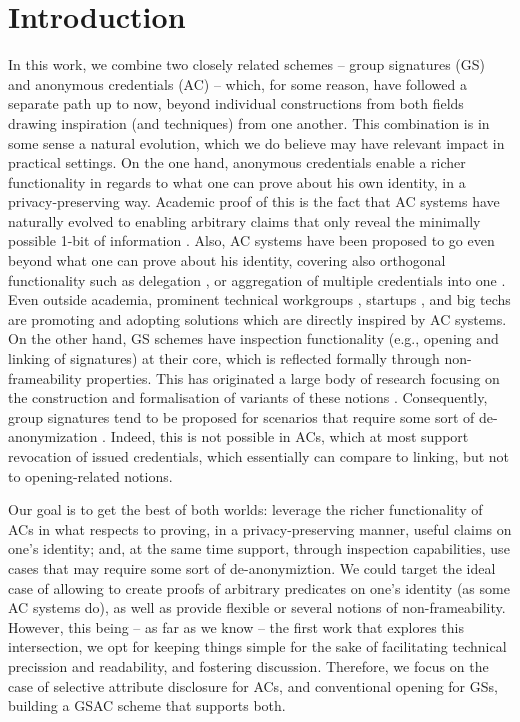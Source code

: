 \section{Introduction}
\label{sec:introduction}

In this work, we combine two closely related schemes -- group signatures (GS)
and anonymous credentials (AC) -- which, for some reason, have followed a
separate path up to now, beyond individual constructions from both fields
drawing inspiration (and techniques) from one another. This combination is in
some sense a natural evolution, which we do believe may have relevant impact in
practical settings. On the one hand, anonymous credentials enable a richer
functionality in regards to what one can prove about his own identity, in a
privacy-preserving way. Academic proof of this is the fact that AC systems have
naturally evolved to enabling arbitrary claims that only reveal the minimally
possible 1-bit of information \needcite. Also, AC systems have been proposed to
go even beyond what one can prove about his identity, covering also orthogonal
functionality such as delegation \needcite, or aggregation of multiple
credentials into one \needcite. Even outside academia, prominent
technical workgroups \needcite, startups \needcite, and big techs \needcite are
promoting and adopting solutions which are directly inspired by AC systems. On
the other hand, GS 
schemes have inspection functionality (e.g., opening and linking of signatures)
at their core, which is reflected formally through non-frameability properties.
This has originated a large body of research focusing on the construction and
formalisation of variants of these notions \needcite. Consequently, group
signatures tend to be proposed for scenarios that require some sort of
de-anonymization \needcite. Indeed, this is not possible in ACs, which at most
support revocation of issued credentials, which essentially can compare to
linking, but not to opening-related notions.

Our goal is to get the best of both worlds: leverage the richer functionality
of ACs in what respects to proving, in a privacy-preserving manner, useful
claims on one's identity; and, at the same time support, through inspection
capabilities, use cases that may require some sort of de-anonymiztion. We
could target the ideal case of allowing to create proofs of arbitrary predicates
on one's identity (as some AC systems do), as well as provide flexible or several
notions of non-frameability. However, this being -- as far as we know -- the
first work that explores this intersection, we opt for keeping things simple
for the sake of facilitating technical precission and readability, and fostering
discussion. Therefore, we focus on the case of selective attribute disclosure
for ACs, and conventional opening for GSs, building a GSAC scheme that supports
both. 

